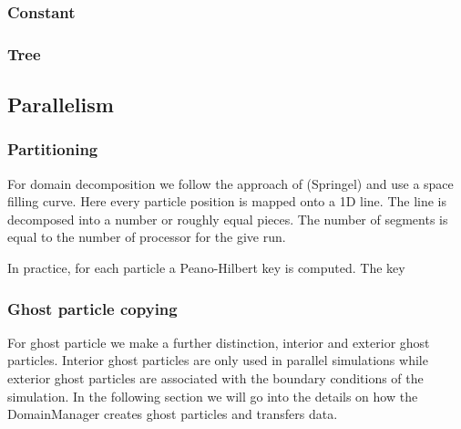 \subsubsection{Constant}
\subsubsection{Tree}

\subsection{Parallelism}
\subsubsection{Partitioning}
For domain decomposition we follow the approach of (Springel) and use
a space filling curve. Here every particle position is mapped onto a
1D line. The line is decomposed into a number or roughly equal pieces.
The number of segments is equal to the number of processor for the
give run.

In practice, for each particle a Peano-Hilbert key is computed. The key

\subsubsection{Ghost particle copying}
For ghost particle we make a further distinction, interior and exterior ghost particles.
Interior ghost particles are only used in parallel simulations while exterior ghost
particles are associated with the boundary conditions of the simulation. In the following
section we will go into the details on how the DomainManager creates ghost particles
and transfers data.
